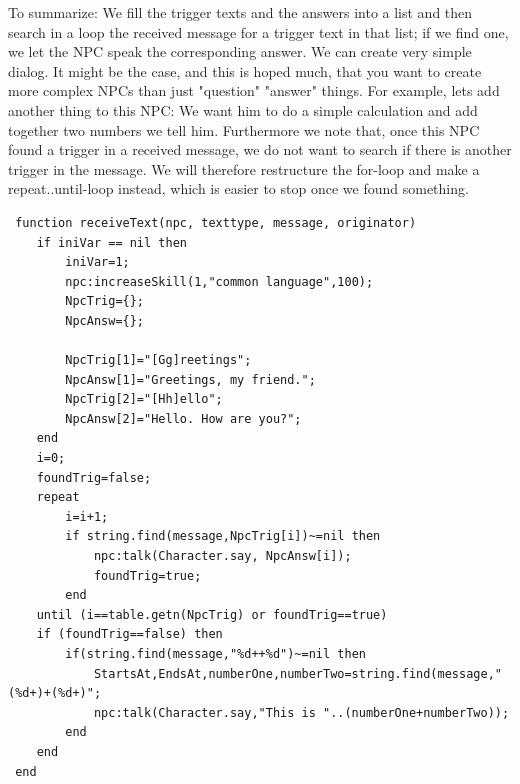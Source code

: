 \documentclass[a4paper,10pt,makeidx]{scrreprt}
\begin{document}
To summarize: We fill the trigger texts and the answers into a list and then search in a loop the received message for a trigger text in that list; if we find one, we let the NPC speak the corresponding answer. We can create very simple dialog.
It might be the case, and this is hoped much, that you want to create more complex NPCs than just "question" "answer" things. For example, lets add another thing to this NPC: We want him to do a simple calculation and add together two numbers we tell him. Furthermore we note that, once this NPC found a trigger in a received message, we do not want to search if there is another trigger in the message. We will therefore restructure the for-loop and make a repeat..until-loop instead, which is easier to stop once we found something.
\begin{verbatim}
 function receiveText(npc, texttype, message, originator)
    if iniVar == nil then
        iniVar=1;
        npc:increaseSkill(1,"common language",100);
        NpcTrig={};
        NpcAnsw={};

        NpcTrig[1]="[Gg]reetings";
        NpcAnsw[1]="Greetings, my friend.";
        NpcTrig[2]="[Hh]ello";
        NpcAnsw[2]="Hello. How are you?";
    end
    i=0;
    foundTrig=false;
    repeat
        i=i+1;
        if string.find(message,NpcTrig[i])~=nil then
            npc:talk(Character.say, NpcAnsw[i]);
            foundTrig=true;
        end
    until (i==table.getn(NpcTrig) or foundTrig==true)
    if (foundTrig==false) then
        if(string.find(message,"%d++%d")~=nil then
            StartsAt,EndsAt,numberOne,numberTwo=string.find(message,"(%d+)+(%d+)";
            npc:talk(Character.say,"This is "..(numberOne+numberTwo));
        end
    end
 end
\end{verbatim}
\end{document}

